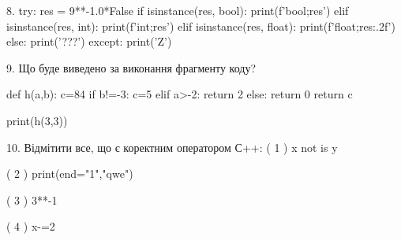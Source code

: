 \documentclass[11pt]{article}
\begin{document}
8. 
try:
    res = 9**-1.0*False
    if isinstance(res, bool):
        print(f'bool;{res}')
    elif isinstance(res, int):
        print(f'int;{res}')
    elif isinstance(res, float):
        print(f'float;{res:.2f}')
    else:
        print('???')
except:
    print('Z')


9. Що буде виведено за виконання фрагменту коду?

def h(a,b):
    c=84
    if b!=-3:
        c=5
    elif a>-2:
         return 2
    else: 
        return 0
    return c

print(h(3,3))


10. %
Відмітити все, що є коректним оператором С++:
( 1 ) x not is y

( 2 ) print(end="1","qwe")

( 3 ) 3**-1

( 4 ) x-=2


\newpage
\end{document}
